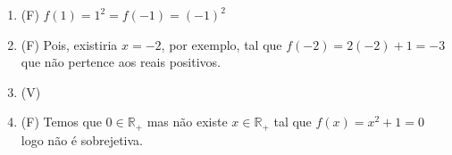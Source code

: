 \begin{enumerate}
		\item (F) $f(1)=1^2 =f(-1)=(-1)^2$
		\item (F) Pois, existiria $x=-2$, por exemplo, tal que $f(-2)=2(-2)+1=-3$ que não pertence aos reais positivos.
		\item (V) 
		\item (F) Temos que $0\in\mathbb{R}_{+}$ mas não existe $x\in\mathbb{R}_+$ tal que $f(x)=x^2+1=0$ logo não é sobrejetiva.
\end{enumerate}
